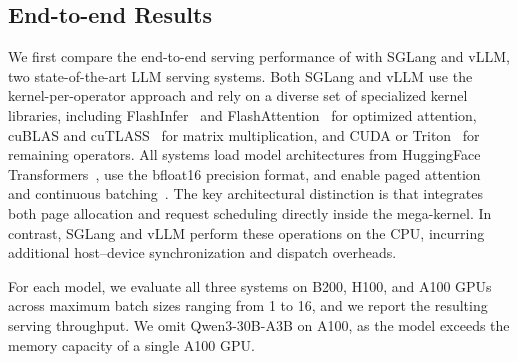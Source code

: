 

\subsection{End-to-end Results}
\label{subsec:end_to_end}

We first compare the end-to-end serving performance of \sys with SGLang and vLLM, two state-of-the-art LLM serving systems. Both SGLang and vLLM use the kernel-per-operator approach and rely on a diverse set of specialized kernel libraries, including  FlashInfer~\cite{ye2025flashinfer} and FlashAttention~\cite{triton-flashattention} for optimized attention, cuBLAS and cuTLASS~\cite{cutlass} for matrix multiplication, and CUDA or Triton~\cite{tillet2019triton} for remaining operators. All systems load model architectures from HuggingFace Transformers~\cite{huggingfacemodels}, use the bfloat16 precision format, and enable paged attention~\cite{kwon2023vllm} and continuous batching~\cite{yu2022orca}. The key architectural distinction is that \sys integrates both page allocation and request scheduling directly inside the mega-kernel. In contrast, SGLang and vLLM perform these operations on the CPU, incurring additional host–device synchronization and dispatch overheads.

For each model, we evaluate all three systems on B200, H100, and A100 GPUs across maximum batch sizes ranging from 1 to 16, and we report the resulting serving throughput. We omit Qwen3-30B-A3B on A100, as the model exceeds the memory capacity of a single A100 GPU.


